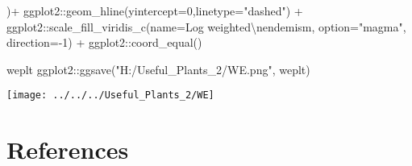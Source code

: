 \documentclass[
]{article}
\newenvironment{Shaded}{\begin{snugshade}}{\end{snugshade}}
\newcommand{\AttributeTok}[1]{\textcolor[rgb]{0.77,0.63,0.00}{#1}}
\newcommand{\DecValTok}[1]{\textcolor[rgb]{0.00,0.00,0.81}{#1}}
\newcommand{\FunctionTok}[1]{\textcolor[rgb]{0.00,0.00,0.00}{#1}}
\newcommand{\NormalTok}[1]{#1}
\newcommand{\SpecialCharTok}[1]{\textcolor[rgb]{0.00,0.00,0.00}{#1}}
\newcommand{\StringTok}[1]{\textcolor[rgb]{0.31,0.60,0.02}{#1}}
\begin{document}
\begin{Shaded}
\begin{Highlighting}[]
\NormalTok{  )}\SpecialCharTok{+}
\NormalTok{  ggplot2}\SpecialCharTok{::}\FunctionTok{geom\_hline}\NormalTok{(}\AttributeTok{yintercept=}\DecValTok{0}\NormalTok{,}\AttributeTok{linetype=}\StringTok{"dashed"}\NormalTok{) }\SpecialCharTok{+}
\NormalTok{  ggplot2}\SpecialCharTok{::}\FunctionTok{scale\_fill\_viridis\_c}\NormalTok{(}\AttributeTok{name=}\StringTok{\textquotesingle{}Log weighted}\SpecialCharTok{\textbackslash{}n}\StringTok{endemism\textquotesingle{}}\NormalTok{,}
                                \AttributeTok{option=}\StringTok{"magma"}\NormalTok{,}
                                \AttributeTok{direction=}\SpecialCharTok{{-}}\DecValTok{1}\NormalTok{) }\SpecialCharTok{+}
\NormalTok{  ggplot2}\SpecialCharTok{::}\FunctionTok{coord\_equal}\NormalTok{()}

\NormalTok{weplt}
\NormalTok{ggplot2}\SpecialCharTok{::}\FunctionTok{ggsave}\NormalTok{(}\StringTok{"H:/Useful\_Plants\_2/WE.png"}\NormalTok{, weplt)}
\end{Highlighting}
\end{Shaded}

\begin{center}\texttt{[image: ../../../Useful\_Plants\_2/WE]} \end{center}

\hypertarget{references}{%
\section*{References}\label{references}}
\end{document}

